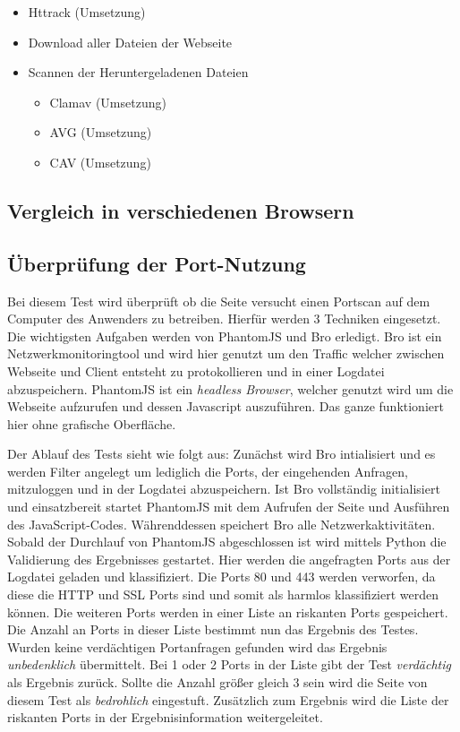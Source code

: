 
\begin{itemize}
  \item Httrack (Umsetzung)
  \item Download aller Dateien der Webseite
  \item Scannen der Heruntergeladenen Dateien
  \begin{itemize}
    \item Clamav (Umsetzung)
    \item AVG (Umsetzung)
    \item CAV (Umsetzung)
  \end{itemize}
\end{itemize}

\subsection{Vergleich in verschiedenen Browsern}


\subsection{Überprüfung der Port-Nutzung}
Bei diesem Test wird überprüft ob die Seite versucht einen Portscan auf dem Computer des Anwenders zu betreiben. Hierfür werden 3 Techniken eingesetzt. Die wichtigsten Aufgaben werden von PhantomJS und Bro erledigt.
Bro ist ein Netzwerkmonitoringtool und wird hier genutzt um den Traffic welcher zwischen Webseite und Client entsteht zu protokollieren und in einer Logdatei abzuspeichern. PhantomJS ist ein \textit{headless Browser}, welcher genutzt wird um die Webseite aufzurufen und dessen Javascript auszuführen. Das ganze funktioniert hier ohne grafische Oberfläche.

Der Ablauf des Tests sieht wie folgt aus: Zunächst wird Bro intialisiert und es werden Filter angelegt um lediglich die Ports, der eingehenden Anfragen, mitzuloggen und in der Logdatei abzuspeichern. Ist Bro vollständig initialisiert und einsatzbereit startet PhantomJS mit dem Aufrufen der Seite und Ausführen des JavaScript-Codes. Währenddessen speichert Bro alle Netzwerkaktivitäten. Sobald der Durchlauf von PhantomJS abgeschlossen ist wird mittels Python die Validierung des Ergebnisses gestartet. Hier werden die angefragten Ports aus der Logdatei geladen und klassifiziert. Die Ports 80 und 443 werden verworfen, da diese die HTTP und SSL Ports sind und somit als harmlos klassifiziert werden können. Die weiteren Ports werden in einer Liste an riskanten Ports gespeichert. Die Anzahl an Ports in dieser Liste bestimmt nun das Ergebnis des Testes. Wurden keine verdächtigen Portanfragen gefunden wird das Ergebnis \textit{unbedenklich} übermittelt. Bei 1 oder 2 Ports in der Liste gibt der Test \textit{verdächtig} als Ergebnis zurück. Sollte die Anzahl größer gleich 3 sein wird die Seite von diesem Test als \textit{bedrohlich} eingestuft. Zusätzlich zum Ergebnis wird die Liste der riskanten Ports in der Ergebnisinformation weitergeleitet.

